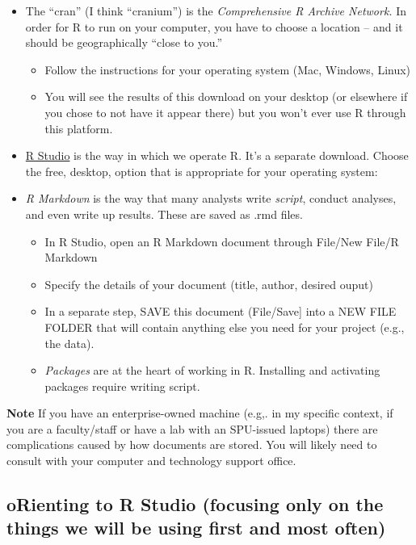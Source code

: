 \documentclass[
  english,
]{book}
\providecommand{\tightlist}{%
  \setlength{\itemsep}{0pt}\setlength{\parskip}{0pt}}
\begin{document}
\begin{itemize}
\tightlist
\item
  The ``cran'' (I think ``cranium'') is the \emph{Comprehensive R Archive Network.} In order for R to run on your computer, you have to choose a location -- and it should be geographically ``close to you.''

  \begin{itemize}
  \tightlist
  \item
    Follow the instructions for your operating system (Mac, Windows, Linux)
  \item
    You will see the results of this download on your desktop (or elsewhere if you chose to not have it appear there) but you won't ever use R through this platform.
  \end{itemize}
\item
  \href{https://www.rstudio.com/products/RStudio/}{R Studio} is the way in which we operate R. It's a separate download. Choose the free, desktop, option that is appropriate for your operating system:\\
\item
  \emph{R Markdown} is the way that many analysts write \emph{script}, conduct analyses, and even write up results. These are saved as .rmd files.

  \begin{itemize}
  \tightlist
  \item
    In R Studio, open an R Markdown document through File/New File/R Markdown
  \item
    Specify the details of your document (title, author, desired ouput)
  \item
    In a separate step, SAVE this document (File/Save{]} into a NEW FILE FOLDER that will contain anything else you need for your project (e.g., the data).
  \item
    \emph{Packages} are at the heart of working in R. Installing and activating packages require writing script.
  \end{itemize}
\end{itemize}

\textbf{Note} If you have an enterprise-owned machine (e.g,. in my specific context, if you are a faculty/staff or have a lab with an SPU-issued laptops) there are complications caused by how documents are stored. You will likely need to consult with your computer and technology support office.

\hypertarget{orienting-to-r-studio-focusing-only-on-the-things-we-will-be-using-first-and-most-often}{%
\subsection{oRienting to R Studio (focusing only on the things we will be using first and most often)}\label{orienting-to-r-studio-focusing-only-on-the-things-we-will-be-using-first-and-most-often}}
\end{document}
